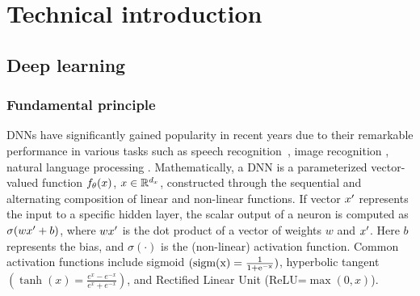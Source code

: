 \chapter{Technical introduction}
\label{chap:main_concepts}


\localtableofcontents

\pagebreak


\section{Deep learning}
\label{sub:nn}


\subsection{Fundamental principle}
\label{sub:principle}
DNNs 
have significantly gained popularity in recent years
due to their remarkable performance in various tasks such as speech 
recognition~\citep{deng2013new, chan2016listen,
abdel2013exploring}, image recognition \citep{fu2017look, traore2018deep,
zheng2017learning}, natural language processing \citep{collobert2008unified,
goldberg2017neural}. %
Mathematically, a DNN is a parameterized vector-valued function $f_{\theta}(x)$, $x \in
\mathbb{R}^{d_x}$, constructed through the sequential and alternating
composition of linear and non-linear functions. 
If vector $x'$ represents the input to a specific hidden layer, the scalar
output of a neuron is computed as $\sigma(wx'+b)$, where
 $wx'$ is the dot product of a vector of
weights $w$ and $x'$. Here $b$
represents the bias, and $\sigma(\cdot)$ is the (non-linear) activation
function. Common activation functions include sigmoid $(\rm sigm(x) = \frac{1}{1 + e^{-x}})$,
 hyperbolic  tangent $(\tanh(x) = \frac{e^x - e^{-x}}{e^x + e^{-x}})$, 
 and  Rectified Linear Unit (ReLU=$\max(0,x)$).


